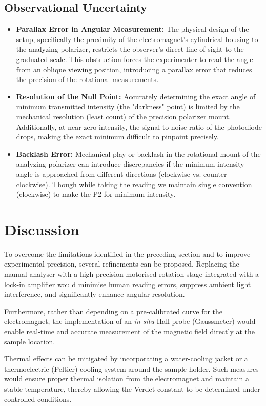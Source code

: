\subsection{Observational Uncertainty}
\begin{itemize}
    \item \textbf{Parallax Error in Angular Measurement:} The physical design of the setup, specifically the proximity of the electromagnet's cylindrical housing to the analyzing polarizer, restricts the observer's direct line of sight to the graduated scale. This obstruction forces the experimenter to read the angle from an oblique viewing position, introducing a parallax error that reduces the precision of the rotational measurements.
    \item \textbf{Resolution of the Null Point:} Accurately determining the exact angle of minimum transmitted intensity (the "darkness" point) is limited by the mechanical resolution (least count) of the precision polarizer mount. Additionally, at near-zero intensity, the signal-to-noise ratio of the photodiode drops, making the exact minimum difficult to pinpoint precisely.
    \item \textbf{Backlash Error:} Mechanical play or backlash in the rotational mount of the analyzing polarizer can introduce discrepancies if the minimum intensity angle is approached from different directions (clockwise vs. counter-clockwise). Though while taking the reading we maintain single convention (clockwise) to make the P2 for minimum intensity.
\end{itemize}
\section{Discussion}

To overcome the limitations identified in the preceding section and to improve experimental precision, several refinements can be proposed. Replacing the manual analyser with a high-precision motorised rotation stage integrated with a lock-in amplifier would minimise human reading errors, suppress ambient light interference, and significantly enhance angular resolution.

Furthermore, rather than depending on a pre-calibrated curve for the electromagnet, the implementation of an \textit{in situ} Hall probe (Gaussmeter) would enable real-time and accurate measurement of the magnetic field directly at the sample location.

Thermal effects can be mitigated by incorporating a water-cooling jacket or a thermoelectric (Peltier) cooling system around the sample holder. Such measures would ensure proper thermal isolation from the electromagnet and maintain a stable temperature, thereby allowing the Verdet constant to be determined under controlled conditions.

